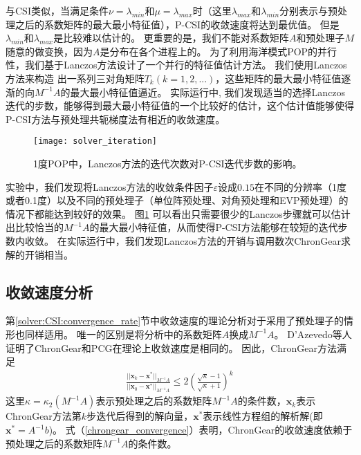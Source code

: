 与CSI类似，当满足条件$\nu = \lambda_{min}$和$\mu =\lambda_{max}$时（这里$\lambda_{max}$和$\lambda_{min}$分别表示与预处理之后的系数矩阵的最大最小特征值），P-CSI的收敛速度将达到最优值。 
但是$\lambda_{min}$和$\lambda_{max}$是比较难以估计的。
更重要的是，我们不能对系数矩阵$A$和预处理子$M$随意的做变换，因为$A$是分布在各个进程上的。
为了利用海洋模式POP的并行性，我们基于Lanczos方法设计了一个并行的特征值估计方法。
我们使用Lanczos方法来构造 出一系列三对角矩阵$T_k(k=1,2,...)$，这些矩阵的最大最小特征值逐渐的向$M^{-1}A$的最大最小特征值逼近。
实际运行中, 我们发现适当的选择Lanczos迭代的步数，能够得到最大最小特征值的一个比较好的估计，这个估计值能够使得P-CSI方法与预处理共轭梯度法有相近的收敛速度。  
  

\begin {figure}[!t]
\begin{center}
\texttt{[image: solver\_iteration]}
\caption []{1度POP中，Lanczos方法的迭代次数对P-CSI迭代步数的影响。 \label{fig:iter}}
\end{center}
\end {figure}
实验中，我们发现将Lanczos方法的收敛条件因子$\varepsilon$设成$0.15$在不同的分辨率（1度或者0.1度）以及不同的预处理子（单位阵预处理、对角预处理和EVP预处理）的情况下都能达到较好的效果。 
图\ref{fig:iter} 可以看出只需要很少的Lanczos步骤就可以估计出比较恰当的$M^{-1}A$的最大最小特征值，从而使得P-CSI方法能够在较短的迭代步数内收敛。
在实际运行中，我们发现Lanczos方法的开销与调用数次ChronGear求解的开销相当。 

\subsection{收敛速度分析}
\label{precond:converge}

第\ref{solver:CSI:convergence_rate}节中收敛速度的理论分析对于采用了预处理子的情形也同样适用。
唯一的区别是将分析中的系数矩阵$A$换成$M^{-1}A$。
D'Azevedo\cite{dAzevedo1999lapack}等人证明了ChronGear和PCG在理论上收敛速度是相同的。
因此，ChronGear方法满足 
\begin{align}
\label{chrongear_convergence}
\frac{||\textbf{x}_k-\textbf{x}^*||_{M^{-1}A}}{||\textbf{x}_0-\textbf{x}^*||_{M^{-1}A}}\le  2 (\frac{\sqrt{\kappa}-1}{\sqrt{\kappa}+1})^k 
\end{align}
这里$\kappa =  \kappa_2({M^{-1}A})$表示预处理之后的系数矩阵${M^{-1}A}$的条件数，$\textbf{x}_k$表示ChronGear方法第$k$步迭代后得到的解向量，$\textbf{x}^*$表示线性方程组的解析解(即$\textbf{x}^* = A^{-1}b$)。
式（\ref{chrongear_convergence}）表明，ChronGear的收敛速度依赖于预处理之后的系数矩阵${M^{-1}A}$的条件数。 


